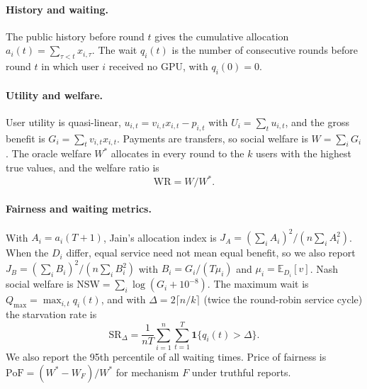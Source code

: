 \documentclass{article}
\theoremstyle{plain}
\theoremstyle{definition}
\newcommand{\WR}{\mathrm{WR}}
\newcommand{\JA}{J_A}
\newcommand{\JB}{J_B}
\newcommand{\SR}{\mathrm{SR}_\Delta}
\newcommand{\Qmax}{Q_{\max}}
\begin{document}
\paragraph{History and waiting.}
The public history before round $t$ gives the cumulative allocation $a_i(t)=\sum_{\tau<t}x_{i,\tau}$.
The wait $q_i(t)$ is the number of consecutive rounds before round $t$ in which user $i$ received no GPU, with $q_i(0)=0$.

\paragraph{Utility and welfare.}
User utility is quasi-linear, $u_{i,t}=v_{i,t}x_{i,t}-p_{i,t}$ with $U_i=\sum_t u_{i,t}$, and the gross benefit is $G_i=\sum_t v_{i,t}x_{i,t}$.
Payments are transfers, so social welfare is $W=\sum_i G_i$.
The oracle welfare $W^*$ allocates in every round to the $k$ users with the highest true values, and the welfare ratio is
\begin{equation}
\WR = W/W^*.
\end{equation}

\paragraph{Fairness and waiting metrics.}
With $A_i=a_i(T+1)$, Jain's allocation index is $\JA=(\sum_i A_i)^2/(n\sum_i A_i^2)$.
When the $D_i$ differ, equal service need not mean equal benefit, so we also report $\JB=(\sum_i B_i)^2/(n\sum_i B_i^2)$ with $B_i=G_i/(T\mu_i)$ and $\mu_i=\mathbb{E}_{D_i}[v]$.
Nash social welfare is $\mathrm{NSW}=\sum_i\log(G_i+10^{-8})$.
The maximum wait is $\Qmax=\max_{i,t}q_i(t)$, and with $\Delta=2\lceil n/k\rceil$ (twice the round-robin service cycle) the starvation rate is
\begin{equation}
\SR=\frac{1}{nT}\sum_{i=1}^{n}\sum_{t=1}^{T}\mathbf{1}\{q_i(t)>\Delta\}.
\end{equation}
We also report the 95th percentile of all waiting times.
Price of fairness is $\mathrm{PoF}=(W^*-W_F)/W^*$ for mechanism $F$ under truthful reports.
\end{document}
